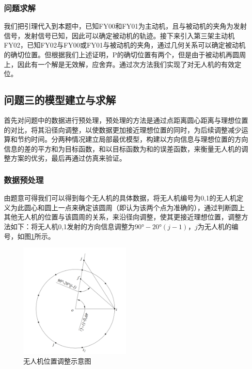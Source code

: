 \documentclass[withoutpreface,bwprint]{cumcmthesis} %
\begin{document}
\subsubsection{问题求解}
我们把引理代入到本题中，已知FY00和FY01为主动机，且与被动机的夹角为发射信号，发射信号已知，因此可以确定被动机的轨迹。接下来引入第三架主动机FY02，已知FY02与FY00或FY01与被动机的夹角，通过几何关系可以确定被动机的确切位置。但根据我们上述证明，P的确切位置有两个，但是由于被动机再圆周上，因此有一个解是无效解，应舍弃。通过次方法我们实现了对无人机的有效定位。



\subsection{问题三的模型建立与求解}
首先对问题中的数据进行预处理，预处理的方法是通过点距离圆心距离与理想位置的对比，将其沿径向调整，以使数据更加接近理想位置的同时，为后续调整减少运算和节约时间。分两种情况建立局部最优模型，构建以方向信息与理想位置的方向信息的差的平方和为目标函数，和以目标函数为和的误差函数，来衡量无人机的调整方案的优劣，最后再通过仿真来验证。

\subsubsection{数据预处理}
由题意可得我们可以得到每个无人机的具体数据，将无人机编号为0,1的无人机定义为此圆心和圆上一点来确定该圆周（即认为该两个点为准确的），通过判断圆上其他无人机的位置与该圆周的关系，来沿径向调整，使其更接近理想位置，调整方法如下：将无人机0,1发射的方向信息调整为$90°-20°(j-1)$，$j$为无人机的编号，如图\ref{q3_1}所示。

\begin{figure}[htbp]
    \centering
    \includegraphics[width=0.5\textwidth]{../../figure/q3_1.png} 
    \caption{无人机位置调整示意图}
    \label{q3_1}    
\end{figure}
\end{document}
